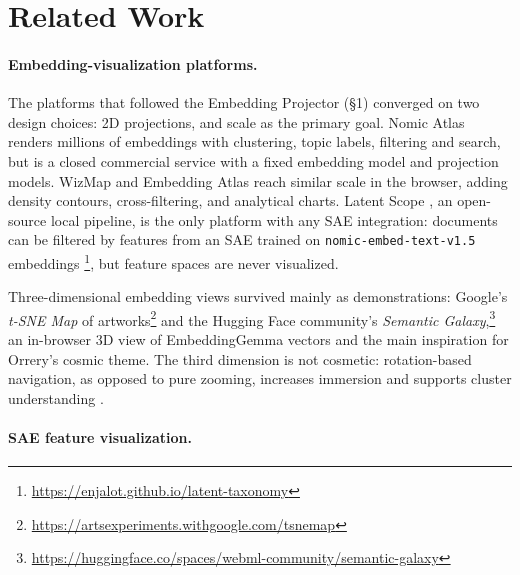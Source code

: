 \documentclass[11pt]{article}
\begin{document}
\section{Related Work}
\label{sec:related}

\paragraph{Embedding-visualization platforms.}



The platforms that followed the Embedding Projector (\S1) converged on two design choices: 2D projections, and scale as the primary goal. Nomic Atlas \cite{nomic2022atlas} renders millions of embeddings with clustering, topic labels, filtering and search, but is a closed commercial service with a fixed embedding model and projection models. WizMap \cite{wang2023wizmapscalableinteractivevisualization} and Embedding Atlas \cite{ren2025embeddingatlaslowfrictioninteractive} reach similar scale in the browser, adding density contours, cross-filtering, and analytical charts. Latent Scope \cite{johnson2024latentscope}, an
open-source local pipeline, is the only platform with any SAE integration: documents can be filtered by features from an SAE trained on \texttt{nomic-embed-text-v1.5} embeddings \footnote{\url{https://enjalot.github.io/latent-taxonomy}}, but feature spaces are never visualized. 

Three-dimensional embedding views survived mainly as demonstrations: Google's \textit{t-SNE Map} of
artworks\footnote{\url{https://artsexperiments.withgoogle.com/tsnemap}} and the Hugging Face community's \textit{Semantic Galaxy},\footnote{\url{https://huggingface.co/spaces/webml-community/semantic-galaxy}} an in-browser 3D view of EmbeddingGemma \cite{vera2025embeddinggemmapowerfullightweighttext} vectors and the main inspiration for Orrery's cosmic theme. The third dimension is not cosmetic: rotation-based navigation, as opposed to pure zooming, increases immersion and supports cluster understanding \citep{9222098}.   





\paragraph{SAE feature visualization.}
\end{document}
